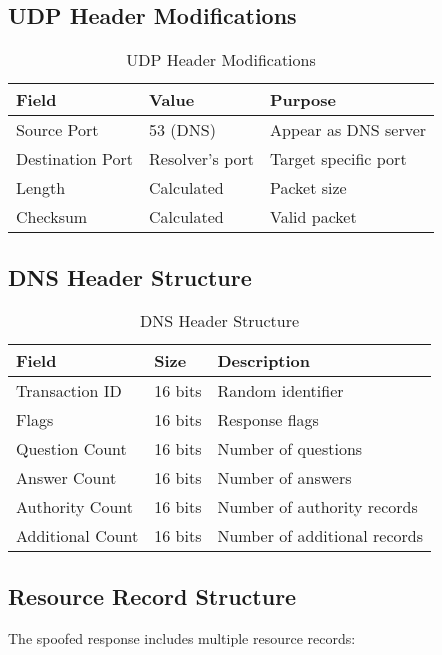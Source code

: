 \documentclass[12pt,a4paper]{article}
\begin{document}
\subsection{UDP Header Modifications}

\begin{table}[H]
\centering
\begin{tabular}{|l|l|l|}
\hline
\textbf{Field} & \textbf{Value} & \textbf{Purpose} \\
\hline
Source Port & 53 (DNS) & Appear as DNS server \\
Destination Port & Resolver's port & Target specific port \\
Length & Calculated & Packet size \\
Checksum & Calculated & Valid packet \\
\hline
\end{tabular}
\caption{UDP Header Modifications}
\label{tab:udp_header}
\end{table}

\subsection{DNS Header Structure}

\begin{table}[H]
\centering
\begin{tabular}{|l|l|l|}
\hline
\textbf{Field} & \textbf{Size} & \textbf{Description} \\
\hline
Transaction ID & 16 bits & Random identifier \\
Flags & 16 bits & Response flags \\
Question Count & 16 bits & Number of questions \\
Answer Count & 16 bits & Number of answers \\
Authority Count & 16 bits & Number of authority records \\
Additional Count & 16 bits & Number of additional records \\
\hline
\end{tabular}
\caption{DNS Header Structure}
\label{tab:dns_header}
\end{table}

\subsection{Resource Record Structure}

The spoofed response includes multiple resource records:
\end{document}
